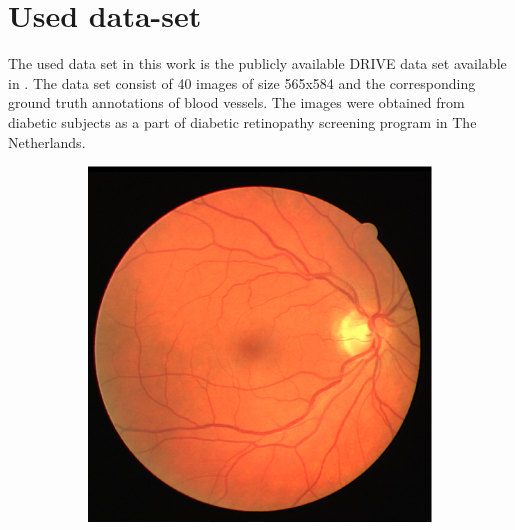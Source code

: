 \documentclass[aps,prb,10pt,twocolumn,groupedaddress]{revtex4-1}
\begin{document}
\section{Used data-set}
\label{sec:used_data_set}
The used data set in this work is the publicly available DRIVE data set \cite{staal} available in \cite{driveurl}. The data set consist of 40 images of size 565x584 and the corresponding ground truth annotations of blood vessels. The images were obtained from diabetic subjects as a part of diabetic retinopathy screening program in The Netherlands.
\begin{figure}[!t]
	\centering
	\begin{subfigure}[]{0.4\textwidth}
		\centering
		\includegraphics[width=\textwidth]{images/02_training.eps}
		\caption{}
	\end{subfigure}
	\hspace{1cm}
	\centering
	\begin{subfigure}[]{0.4\textwidth}
		\centering

\end{subfigure}
\end{figure}
\end{document}
